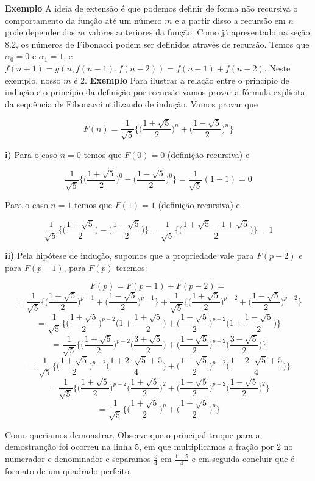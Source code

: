 \textbf{Exemplo} A ideia de extensão é que podemos definir de forma não recursiva o comportamento da
função até um número $m$ e a partir disso a recursão em $n$ pode depender dos $m$ valores anteriores da 
função. Como já apresentado na seção 8.2, os números de Fibonacci podem ser definidos através de 
recursão. Temos que $\alpha_0 = 0$ e $\alpha_1 = 1$, e $f(n+1) = g(n, f(n-1), f(n-2)) = f(n-1) + f(n-2)$. 
Neste exemplo, nosso $m$ é 2.
\newline \textbf{Exemplo} Para ilustrar a relação entre o princípio de indução e o princípio da definição por recursão
vamos provar a fórmula explícita da sequência de Fibonacci utilizando de indução. Vamos provar que
\begin{center}   
\[ F(n) = \frac{1}{\sqrt{5}}\bigg \{ \Big (\frac{1+\sqrt{5}}{2} \Big )^n + \Big (\frac{1-\sqrt{5}}{2}\Big )^n\bigg \}\]
\end{center}
\textbf{i)} Para o caso $n=0$ temos que $F(0) = 0$ (definição recursiva) e
\begin{center}
    \[ \frac{1}{\sqrt{5}}\bigg \{ \Big(\frac{1+\sqrt{5}}{2}\Big)^0 - \Big(\frac{1-\sqrt{5}}{2}\Big)^0 \bigg \} = \frac{1}{\sqrt{5}}(1 - 1) = 0 \]
\end{center}
Para o caso $n=1$ temos que $F(1) = 1$ (definição recursiva) e
\begin{center}
    \[ \frac{1}{\sqrt{5}} \bigg \{ \Big(\frac{1+\sqrt{5}}{2} \Big) - \Big(\frac{1 -\sqrt{5}}{2} \Big)\bigg \} =\frac{1}{\sqrt{5}} \bigg \{ \Big(\frac{1+\sqrt{5} - 1 + \sqrt{5}}{2} \Big)\bigg \} = 1\]
\end{center}
\textbf{ii)} Pela hipótese de indução, supomos que a propriedade vale para $F(p-2)$ e para $F(p-1)$,
para $F(p)$ teremos:
\begin{center}
    \[ F(p) = F(p-1) + F(p-2) = \]
    \[ = \frac{1}{\sqrt{5}}\bigg \{ \Big (\frac{1+\sqrt{5}}{2} \Big )^{p-1} + \Big (\frac{1-\sqrt{5}}{2}\Big )^{p-1}\bigg \} + \frac{1}{\sqrt{5}}\bigg \{ \Big (\frac{1+\sqrt{5}}{2} \Big )^{p-2} + \Big (\frac{1-\sqrt{5}}{2}\Big )^{p-2}\bigg \}\]
    \[ = \frac{1}{\sqrt{5}}\bigg \{ \Big (\frac{1+\sqrt{5}}{2} \Big )^{p-2} \Big( 1 + \frac{1+\sqrt{5}}{2}\Big) + \Big (\frac{1-\sqrt{5}}{2}\Big )^{p-2} \Big( 1 +\frac{1 - \sqrt{5}}{2}\Big)\bigg \}\]
    \[ = \frac{1}{\sqrt{5}}\bigg \{ \Big (\frac{1+\sqrt{5}}{2} \Big )^{p-2} \Big( \frac{3+\sqrt{5}}{2}\Big) + \Big (\frac{1-\sqrt{5}}{2}\Big )^{p-2} \Big( \frac{3 - \sqrt{5}}{2}\Big)\bigg \}\]
    \[ = \frac{1}{\sqrt{5}}\bigg \{ \Big (\frac{1+\sqrt{5}}{2} \Big )^{p-2} \Big( \frac{1+2\cdot \sqrt{5} + 5}{4}\Big) + \Big (\frac{1-\sqrt{5}}{2}\Big )^{p-2} \Big( \frac{1 - 2\cdot \sqrt{5} +5}{4}\Big)\bigg \}\]
    \[ = \frac{1}{\sqrt{5}}\bigg \{ \Big (\frac{1+\sqrt{5}}{2} \Big )^{p-2} \Big( \frac{1+\sqrt{5}}{2}\Big)^2 + \Big (\frac{1-\sqrt{5}}{2}\Big )^{p-2} \Big( \frac{1 - \sqrt{5}}{2}\Big)^2 \bigg \}\]
    \[ = \frac{1}{\sqrt{5}}\bigg \{ \Big (\frac{1+\sqrt{5}}{2} \Big )^p + \Big (\frac{1-\sqrt{5}}{2}\Big )^p\bigg \} \]
\end{center}
Como queriamos demonstrar. Observe que o principal truque para a demostranção foi ocorreu na linha 5, 
em que multiplicamos a fração por $2$ no numerador e denominador e separamos $\frac{6}{4}$ em $\frac{1+5}{4}$
e em seguida concluir que é formato de um quadrado perfeito.

